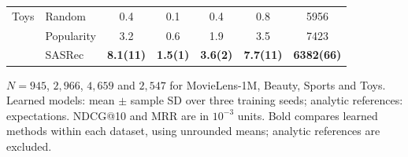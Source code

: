 \begin{table}[!htbp]
\begin{tabular*}{\textwidth}{@{\extracolsep{\fill}}llS[table-format=2.1(3)]S[table-format=2.1(3)]S[table-format=2.1(3)]S[table-format=2.1(3)]S[table-format=5.0(3),table-align-uncertainty=false]@{}}
\midrule
Toys & Random & 0.4 & 0.1 & 0.4 & 0.8 & 5956\\ %
 & Popularity & 3.2 & 0.6 & 1.9 & 3.5 & 7423\\ %
 & SASRec & \bfseries 8.1(11) & \bfseries 1.5(1) & \bfseries 3.6(2) & \bfseries 7.7(11) & \bfseries 6382(66)\\ %
\bottomrule
\end{tabular*}
\par\smallskip\noindent\begin{minipage}{\textwidth}\fontsize{8.5}{11}\selectfont $N=945$, $2{,}966$, $4{,}659$ and $2{,}547$ for MovieLens-1M, Beauty, Sports and Toys. Learned models: mean $\pm$ sample SD over three training seeds; analytic references: expectations. NDCG@10 and MRR are in $10^{-3}$ units. Bold compares learned methods within each dataset, using unrounded means; analytic references are excluded.
\end{minipage}
\end{table}
